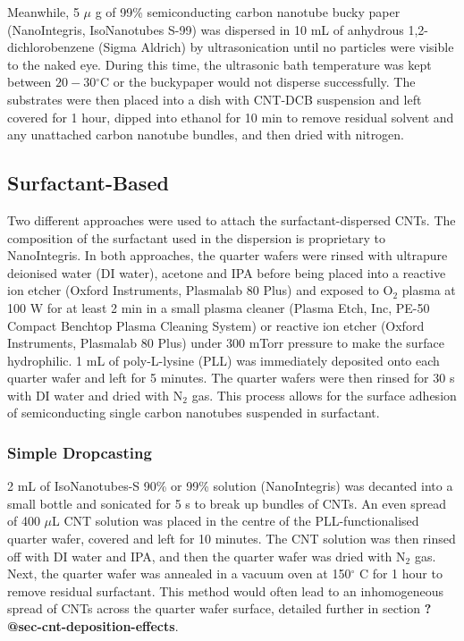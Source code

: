 \documentclass[
  a4paper,
]{scrbook}
\begin{document}
Meanwhile, 5 \(\mu\) g of 99\% semiconducting carbon nanotube bucky
paper (NanoIntegris, IsoNanotubes S-99) was dispersed in 10 mL of
anhydrous 1,2-dichlorobenzene (Sigma Aldrich) by ultrasonication until
no particles were visible to the naked eye. During this time, the
ultrasonic bath temperature was kept between \(20-30\)\(^\circ\)C or the
buckypaper would not disperse successfully. The substrates were then
placed into a dish with CNT-DCB suspension and left covered for 1 hour,
dipped into ethanol for 10 min to remove residual solvent and any
unattached carbon nanotube bundles, and then dried with nitrogen.

\hypertarget{surfactant-based}{%
\subsection{Surfactant-Based}\label{surfactant-based}}

Two different approaches were used to attach the surfactant-dispersed
CNTs. The composition of the surfactant used in the dispersion is
proprietary to NanoIntegris. In both approaches, the quarter wafers were
rinsed with ultrapure deionised water (DI water), acetone and IPA before
being placed into a reactive ion etcher (Oxford Instruments, Plasmalab
80 Plus) and exposed to O\(_2\) plasma at 100 W for at least 2 min in a
small plasma cleaner (Plasma Etch, Inc, PE-50 Compact Benchtop Plasma
Cleaning System) or reactive ion etcher (Oxford Instruments, Plasmalab
80 Plus) under 300 mTorr pressure to make the surface hydrophilic. 1 mL
of poly-L-lysine (PLL) was immediately deposited onto each quarter wafer
and left for 5 minutes. The quarter wafers were then rinsed for 30 s
with DI water and dried with N\(_2\) gas. This process allows for the
surface adhesion of semiconducting single carbon nanotubes suspended in
surfactant.

\hypertarget{simple-dropcasting}{%
\subsubsection*{Simple Dropcasting}\label{simple-dropcasting}}

2 mL of IsoNanotubes-S 90\% or 99\% solution (NanoIntegris) was decanted
into a small bottle and sonicated for 5 s to break up bundles of CNTs.
An even spread of 400 \(\mu\)L CNT solution was placed in the centre of
the PLL-functionalised quarter wafer, covered and left for 10 minutes.
The CNT solution was then rinsed off with DI water and IPA, and then the
quarter wafer was dried with N\(_2\) gas. Next, the quarter wafer was
annealed in a vacuum oven at 150\(^\circ\) C for 1 hour to remove
residual surfactant. This method would often lead to an inhomogeneous
spread of CNTs across the quarter wafer surface, detailed further in
section \textbf{?@sec-cnt-deposition-effects}.
\end{document}

